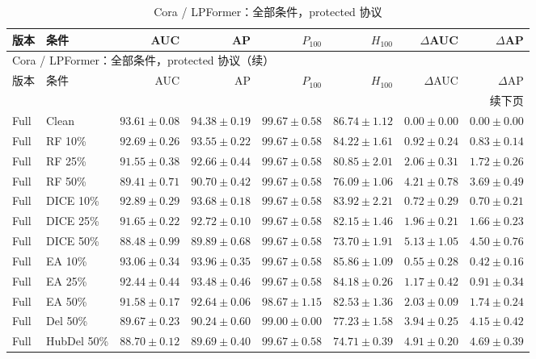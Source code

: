 {\footnotesize
\setlength{\tabcolsep}{3.2pt}
\renewcommand{\arraystretch}{1.10}
\begin{longtable}{llrrrrrr}
\caption{Cora / LPFormer：全部条件，protected 协议}\\
\toprule
版本 & 条件 & AUC & AP & $P_{100}$ & $H_{100}$ & $\Delta$AUC & $\Delta$AP \\
\midrule
\endfirsthead
\multicolumn{8}{l}{Cora / LPFormer：全部条件，protected 协议（续）}\\
\toprule
版本 & 条件 & AUC & AP & $P_{100}$ & $H_{100}$ & $\Delta$AUC & $\Delta$AP \\
\midrule
\endhead
\midrule\multicolumn{8}{r}{续下页}\\
\endfoot
\bottomrule
\endlastfoot
Full & Clean & $93.61\pm0.08$ & $94.38\pm0.19$ & $99.67\pm0.58$ & $86.74\pm1.12$ & $0.00\pm0.00$ & $0.00\pm0.00$ \\
Full & RF 10\% & $92.69\pm0.26$ & $93.55\pm0.22$ & $99.67\pm0.58$ & $84.22\pm1.61$ & $0.92\pm0.24$ & $0.83\pm0.14$ \\
Full & RF 25\% & $91.55\pm0.38$ & $92.66\pm0.44$ & $99.67\pm0.58$ & $80.85\pm2.01$ & $2.06\pm0.31$ & $1.72\pm0.26$ \\
Full & RF 50\% & $89.41\pm0.71$ & $90.70\pm0.42$ & $99.67\pm0.58$ & $76.09\pm1.06$ & $4.21\pm0.78$ & $3.69\pm0.49$ \\
Full & DICE 10\% & $92.89\pm0.29$ & $93.68\pm0.18$ & $99.67\pm0.58$ & $83.92\pm2.21$ & $0.72\pm0.29$ & $0.70\pm0.21$ \\
Full & DICE 25\% & $91.65\pm0.22$ & $92.72\pm0.10$ & $99.67\pm0.58$ & $82.15\pm1.46$ & $1.96\pm0.21$ & $1.66\pm0.23$ \\
Full & DICE 50\% & $88.48\pm0.99$ & $89.89\pm0.68$ & $99.67\pm0.58$ & $73.70\pm1.91$ & $5.13\pm1.05$ & $4.50\pm0.76$ \\
Full & EA 10\% & $93.06\pm0.34$ & $93.96\pm0.35$ & $99.67\pm0.58$ & $85.86\pm1.09$ & $0.55\pm0.28$ & $0.42\pm0.16$ \\
Full & EA 25\% & $92.44\pm0.44$ & $93.48\pm0.46$ & $99.67\pm0.58$ & $84.18\pm0.26$ & $1.17\pm0.42$ & $0.91\pm0.34$ \\
Full & EA 50\% & $91.58\pm0.17$ & $92.64\pm0.06$ & $98.67\pm1.15$ & $82.53\pm1.36$ & $2.03\pm0.09$ & $1.74\pm0.24$ \\
Full & Del 50\% & $89.67\pm0.23$ & $90.24\pm0.60$ & $99.00\pm0.00$ & $77.23\pm1.58$ & $3.94\pm0.25$ & $4.15\pm0.42$ \\
Full & HubDel 50\% & $88.70\pm0.12$ & $89.69\pm0.40$ & $99.67\pm0.58$ & $74.71\pm0.39$ & $4.91\pm0.20$ & $4.69\pm0.39$ \\

\end{longtable}}
